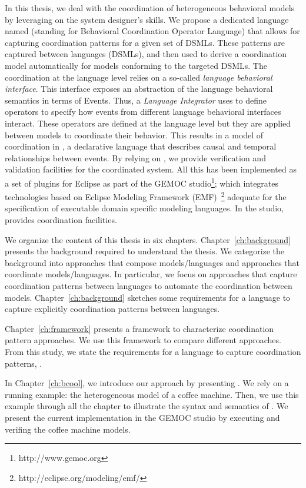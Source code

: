 In this thesis, we deal with the coordination of heterogeneous behavioral models by leveraging on the system designer's skills. We propose a dedicated language named \bcool (standing for Behavioral Coordination Operator Language) that allows for capturing coordination patterns for a given set of DSMLs. These patterns are captured between languages (DSMLs), and then used to derive a coordination model automatically for models conforming to the targeted DSMLs. The coordination at the language level relies on a so-called \emph{language behavioral interface}. This interface exposes an abstraction of the language behavioral semantics in terms of Events. Thus, a \emph{Language Integrator} uses \bcool to define operators to specify how events from different language behavioral interfaces interact. These operators are defined at the language level but they are applied between models to coordinate their behavior. This results in a model of coordination in \ccsl, a declarative language that describes causal and temporal relationships between events. By relying on \ccsl, we provide verification and validation facilities for the coordinated system. All this has been implemented as a set of plugins for Eclipse as part of the GEMOC studio\footnote{http://www.gemoc.org}; which integrates technologies based on Eclipse Modeling Framework (EMF)~\footnote{http://eclipse.org/modeling/emf/} adequate for the specification of executable domain specific modeling languages. In the studio, \bcool provides coordination facilities.   

We organize the content of this thesis in six chapters. Chapter~\ref{ch:background} presents the background required to understand the thesis. We categorize the background into approaches that compose models/languages and approaches that coordinate models/languages. In particular, we focus on approaches that capture coordination patterns between languages to automate the coordination between models. Chapter~\ref{ch:background} sketches some requirements for a language to capture explicitly coordination patterns between languages.    

Chapter~\ref{ch:framework} presents a framework to characterize coordination pattern approaches. We use this framework to compare different approaches. From this study, we state the requirements for a language to capture coordination patterns, \ie \bcool.  

In Chapter~\ref{ch:bcool}, we introduce our approach by presenting \bcool. We rely on a running example: the heterogeneous model of a coffee machine. Then, we use this example through all the chapter to illustrate the syntax and semantics of \bcool. We present the current implementation in the GEMOC studio by executing and verifing the coffee machine models. 

